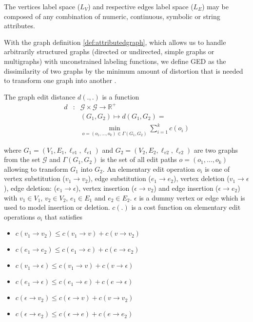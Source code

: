 The vertices label space ($L_V$) and respective edges label space ($L_E$) may be composed of any combination of numeric, continuous, symbolic or string attributes.

With the graph definition \ref{def:attributedgraph}, which  allows us to handle arbitrarily structured graphs (directed or undirected, simple graphs or multigraphs) with unconstrained labeling functions, we define GED as the dissimilarity of two graphs by the minimum amount of distortion that is needed to transform one graph into another \citep{Lerouge2016}.

\begin{definition}
  The graph edit distance $d(.,.)$ is a function 
  \begin{eqnarray*}
    d & : & \mathcal{G} \times \mathcal{G} \rightarrow \mathbb{R}^+ \\
    & & (G_1,G_2) \mapsto d(G_1,G_2) =\\
    & & \min_{o=(o_1,\ldots,o_k)\in \Gamma(G_1,G_2)} \sum_{i=1}^kc(o_i) 
  \end{eqnarray*}
\end{definition}
\noindent where $G_1=(V_1,E_1,\ell_{v1}, \ell_{e1} )$ and $G_2=(V_2,E_2, \ell_{v2}, \ell_{e2})$ are two graphs from the set $\mathcal{G}$ and $\Gamma(G_1,G_2)$ is the set of all edit paths $o=(o_1,\ldots,o_k)$ allowing to transform $G_1$ into $G_2$. An elementary edit operation $o_i$ is one of vertex substitution ($v_1 \rightarrow v_2$), edge substitution ($e_1 \rightarrow e_2$), vertex deletion ($v_1 \rightarrow \epsilon$), edge deletion: ($e_1 \rightarrow \epsilon$), vertex insertion ($ \epsilon \rightarrow v_2$) and edge insertion ($ \epsilon \rightarrow e_2$) with $v_1 \in V_1$, $v_2 \in V_2$, $e_1 \in E_1$ and $e_2 \in E_2$. $\epsilon$ is a dummy vertex or edge which is used to model insertion or deletion. $c(.)$ is a cost function on elementary edit operations $o_i$ that satisfies 
\begin{itemize}
\item $c(v_1 \rightarrow v_2) \leq c(v_1 \rightarrow v) + c(v \rightarrow v_2)$
\item $c(e_1 \rightarrow e_2) \leq c(e_1 \rightarrow e) + c(e \rightarrow e_2)$
\item $c(v_1 \rightarrow \epsilon) \leq c(v_1 \rightarrow v) + c(v \rightarrow \epsilon)$
\item $c(e_1 \rightarrow \epsilon) \leq c(e_1 \rightarrow e) + c(e \rightarrow \epsilon)$
\item $c(\epsilon \rightarrow v_2) \leq c(\epsilon \rightarrow v) + c(v \rightarrow v_2)$
\item $c(\epsilon \rightarrow e_2) \leq c(\epsilon \rightarrow e) + c(e \rightarrow e_2)$
\end{itemize}


